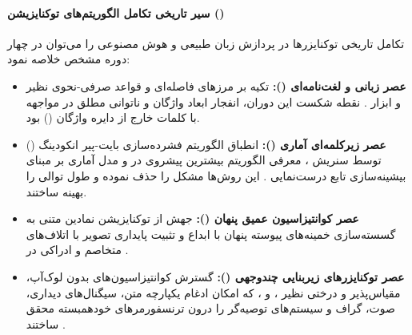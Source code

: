 \paragraph*{سیر تاریخی تکامل الگوریتم‌های توکنایزیشن ()}
تکامل تاریخی توکنایزرها در پردازش زبان طبیعی و هوش مصنوعی را می‌توان در چهار دوره مشخص خلاصه نمود:
\begin{itemize}
    \item \textbf{عصر زبانی و لغت‌نامه‌ای ():} تکیه بر مرزهای فاصله‌ای و قواعد صرفی-نحوی نظیر  \cite{creutz2002unsupervised} و ابزار  \cite{koehn2007moses}. نقطه شکست این دوران، انفجار ابعاد واژگان و ناتوانی مطلق در مواجهه با کلمات خارج از دایره واژگان () بود.
    \item \textbf{عصر زیرکلمه‌ای آماری ():} انطباق الگوریتم فشرده‌سازی بایت-پیر انکودینگ () توسط سنریش \cite{sennrich2016neural}، معرفی الگوریتم بیشترین پیشروی در  \cite{wu2016google} و مدل آماری  بر مبنای بیشینه‌سازی تابع درست‌نمایی \cite{kudo2018subword}. این روش‌ها مشکل  را حذف نموده و طول توالی را بهینه ساختند.
    \item \textbf{عصر کوانتیزاسیون عمیق پنهان ():} جهش از توکنایزیشن نمادین متنی به گسسته‌سازی خمینه‌های پیوسته پنهان با ابداع  \cite{van2017neural} و تثبیت پایداری تصویر با اتلاف‌های متخاصم و ادراکی در  \cite{esser2021taming}.
    \item \textbf{عصر توکنایزرهای زیربنایی چندوجهی ():} گسترش کوانتیزاسیون‌های بدون لوک‌آپ، مقیاس‌پذیر و درختی نظیر  \cite{mentzer2023finite}،  \cite{yu2024language} و  \cite{zhang2024speechtokenizer}، که امکان ادغام یکپارچه متن، سیگنال‌های دیداری، صوت، گراف و سیستم‌های توصیه‌گر را درون ترنسفورمرهای خودهمبسته محقق ساختند \cite{jia2025principles}.
\end{itemize}

